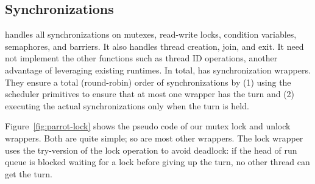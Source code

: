 \subsection{Synchronizations} \label{sec:parrot-sync}



\parrot handles all synchronizations on \pthread mutexes, read-write
locks, condition variables, semaphores, and barriers. It also handles thread
creation, join, and exit.  It need not implement the other \pthread
functions such as thread ID operations, another advantage of leveraging
existing \pthread runtimes. In total, \parrot has \npthreadsync synchronization
wrappers.  They ensure a total (round-robin) order of synchronizations by
(1) using the scheduler primitives to ensure that at most one wrapper has
the turn and (2) executing the actual synchronizations only when the turn
is held.



Figure~\ref{fig:parrot-lock} shows the pseudo code of our \pthread mutex lock and
unlock wrappers.  Both are quite simple; so are most other wrappers.  The
lock wrapper uses the try-version of the \pthread lock operation to avoid
deadlock: if the head of run queue is blocked waiting for a lock before
giving up the turn, no other thread can get the turn.

